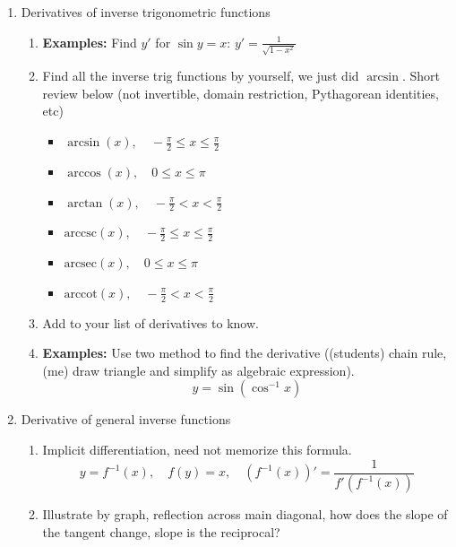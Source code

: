 \documentclass{article}
\begin{document}
\begin{enumerate}
\item Derivatives of inverse trigonometric functions
\begin{enumerate}
\item {\bf Examples:} Find $y'$ for $\sin y = x$: $y' = \frac{1}{\sqrt{1-x^2}}$
\item Find all the inverse trig functions by yourself, we just did $\arcsin$. Short review below (not invertible, domain restriction, Pythagorean identities, etc)
\begin{itemize}
\item $\arcsin(x), \quad -\frac{\pi}{2} \leq x \leq \frac{\pi}{2}$
\item $\arccos(x), \quad 0 \leq x \leq \pi$
\item $\arctan(x), \quad -\frac{\pi}{2} < x < \frac{\pi}{2}$
\item $\text{arccsc}(x), \quad -\frac{\pi}{2} \leq x \leq \frac{\pi}{2}$
\item $\text{arcsec}(x), \quad 0 \leq x \leq \pi$
\item $\text{arccot}(x), \quad -\frac{\pi}{2} < x < \frac{\pi}{2}$
\end{itemize}
\item Add to your list of derivatives to know.
\item {\bf Examples:} Use two method to find the derivative ((students) chain rule, (me) draw triangle and simplify as algebraic expression).
$$
y = \sin(\cos^{-1} x)
$$
\end{enumerate}

\item Derivative of general inverse functions
\begin{enumerate}
\item Implicit differentiation, need not memorize this formula.
$$
y=f^{-1}(x), \quad f(y)=x, \quad (f^{-1}(x))' = \frac{1}{f'(f^{-1}(x))}
$$
\item Illustrate by graph, reflection across main diagonal, how does the slope of the tangent change, slope is the reciprocal?
\end{enumerate}
\end{enumerate}


\end{document}
